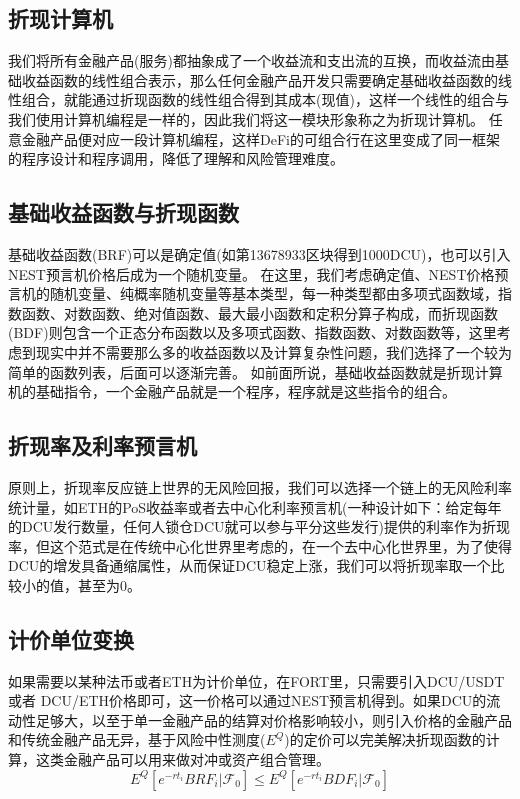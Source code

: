 \documentclass[letterpaper,11pt]{ctexart}
\begin{document}
\subsection{折现计算机}

我们将所有金融产品(服务)都抽象成了一个收益流和支出流的互换，而收益流由基础收益函数的线性组合表示，那么任何金融产品开发只需要确定基础收益函数的线性组合，就能通过折现函数的线性组合得到其成本(现值)，这样一个线性的组合与我们使用计算机编程是一样的，因此我们将这一模块形象称之为折现计算机。
任意金融产品便对应一段计算机编程，这样DeFi的可组合行在这里变成了同一框架的程序设计和程序调用，降低了理解和风险管理难度。

\subsection{基础收益函数与折现函数}

基础收益函数(BRF)可以是确定值(如第13678933区块得到1000DCU)，也可以引入NEST预言机价格后成为一个随机变量。
在这里，我们考虑确定值、NEST价格预言机的随机变量、纯概率随机变量等基本类型，每一种类型都由多项式函数域，指数函数、对数函数、绝对值函数、最大最小函数和定积分算子构成，而折现函数(BDF)则包含一个正态分布函数以及多项式函数、指数函数、对数函数等，这里考虑到现实中并不需要那么多的收益函数以及计算复杂性问题，我们选择了一个较为简单的函数列表，后面可以逐渐完善。
如前面所说，基础收益函数就是折现计算机的基础指令，一个金融产品就是一个程序，程序就是这些指令的组合。


\subsection{折现率及利率预言机}
原则上，折现率反应链上世界的无风险回报，我们可以选择一个链上的无风险利率统计量，如ETH的PoS收益率或者去中心化利率预言机(一种设计如下：给定每年的DCU发行数量，任何人锁仓DCU就可以参与平分这些发行)提供的利率作为折现率，但这个范式是在传统中心化世界里考虑的，在一个去中心化世界里，为了使得DCU的增发具备通缩属性，从而保证DCU稳定上涨，我们可以将折现率取一个比较小的值，甚至为0。

\subsection{计价单位变换}
如果需要以某种法币或者ETH为计价单位，在FORT里，只需要引入DCU/USDT或者 DCU/ETH价格即可，这一价格可以通过NEST预言机得到。如果DCU的流动性足够大，以至于单一金融产品的结算对价格影响较小，则引入价格的金融产品和传统金融产品无异，基于风险中性测度($E^Q$)的定价可以完美解决折现函数的计算，这类金融产品可以用来做对冲或资产组合管理。
\begin{equation}
E^Q\left[e^{-rt_{i}}BRF_{i}|\mathcal{F}_0\right] \leq E^Q\left[e^{-rt_{i}}BDF_{i}|\mathcal{F}_0\right] 
\end{equation}
\end{document}
